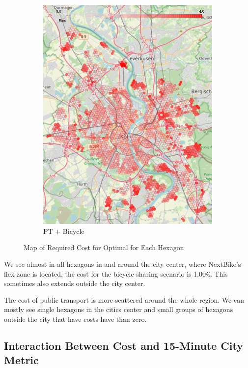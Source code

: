 \begin{figure}
\begin{subfigure}[b]{0.3\textwidth}
         \includegraphics[width=\textwidth]{Figures/results/cost/bicycle_public_transport_cost_map}
         \caption{PT + Bicycle}
         \label{fig:bicycle_public_transport_cost_map}
     \end{subfigure}
       \caption{Map of Required Cost for Optimal for Each Hexagon}
        \label{fig:cost_map_per_scenario}
\end{figure}
We see almost in all hexagons in and around the city center, where NextBike's flex zone is located, the cost for the bicycle sharing scenario is 1.00€.
This sometimes also extends outside the city center.

The cost of public transport is more scattered around the whole region. 
We can mostly see single hexagons in the cities center and small groups of hexagons outside the city that have costs have than zero.

\subsection{Interaction Between Cost and 15-Minute City Metric}
\label{subsec:interaction_between_cost_and_15_minute_city_metric}

